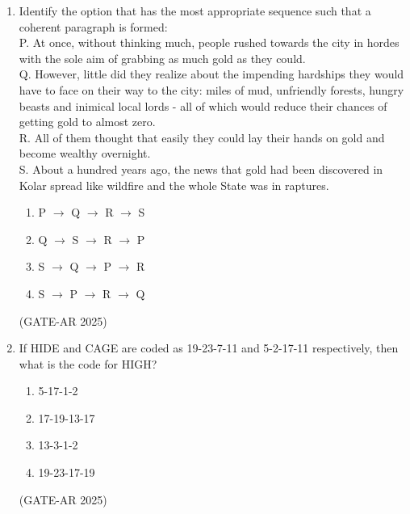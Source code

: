 \documentclass[a4paper,10pt]{article}
\begin{document}
\begin{enumerate}
    \item Identify the option that has the most appropriate sequence such that a coherent paragraph is formed:\\    
    P. At once, without thinking much, people rushed towards the city in hordes with the sole aim of grabbing as much gold as they could.\\    
    Q. However, little did they realize about the impending hardships they would have to face on their way to the city: miles of mud, unfriendly forests, hungry beasts and inimical local lords - all of which would reduce their chances of getting gold to almost zero.\\    
    R. All of them thought that easily they could lay their hands on gold and become wealthy overnight.\\    
    S. About a hundred years ago, the news that gold had been discovered in Kolar spread like wildfire and the whole State was in raptures.
    \begin{multicols}{4}
    \begin{enumerate}
        \item P $\to$ Q $\to$ R $\to$ S
        \item Q $\to$ S $\to$ R $\to$ P
        \item S $\to$ Q $\to$ P $\to$ R
        \item S $\to$ P $\to$ R $\to$ Q
    \end{enumerate}
    \end{multicols}
    \hfill (GATE-AR 2025)

    \item If HIDE and CAGE are coded as 19-23-7-11 and 5-2-17-11 respectively, then what is the code for HIGH?
    \begin{multicols}{4}
    \begin{enumerate}
        \item 5-17-1-2
        \item 17-19-13-17
        \item 13-3-1-2
        \item 19-23-17-19
    \end{enumerate}
    \end{multicols}
    \hfill (GATE-AR 2025)


\end{enumerate}
\end{document}
